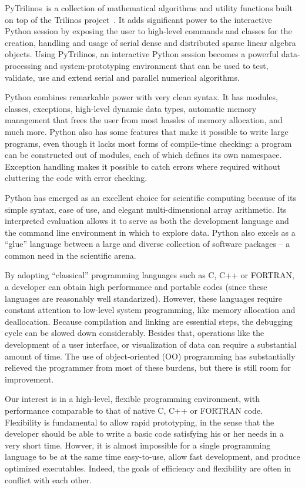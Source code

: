 \documentclass[10pt,relax]{SANDreport}
\newcommand{\PyTrilinos}{{PyTrilinos}}
\begin{document}
\PyTrilinos\ is a collection of mathematical algorithms and utility
functions built on top of the Trilinos
project~\cite{Trilinos-home-page}.  It adds significant power to the
interactive Python session by exposing the user to high-level commands
and classes for the creation, handling and usage of serial dense and
distributed sparse linear algebra objects. Using \PyTrilinos, an
interactive Python session becomes a powerful data-processing and
system-prototyping environment that can be used to test, validate, use
and extend serial and parallel numerical algorithms.

Python combines remarkable power with very clean syntax. It has
modules, classes, exceptions, high-level dynamic data types, automatic
memory management that frees the user from most hassles of memory
allocation, and much more. Python also has some features that make it
possible to write large programs, even though it lacks most forms of
compile-time checking: a program can be constructed out of modules,
each of which defines its own namespace. Exception handling makes it
possible to catch errors where required without cluttering the code
with error checking.

Python has emerged as an excellent choice for scientific computing
because of its simple syntax, ease of use, and elegant
multi-dimensional array arithmetic. Its interpreted evaluation allows
it to serve as both the development language and the command line
environment in which to explore data. Python also excels as a ``glue''
language between a large and diverse collection of software packages
-- a common need in the scientific arena.

\smallskip

By adopting ``classical'' programming languages such as C, C++ or
FORTRAN, a developer can obtain high performance and portable codes
(since these languages are reasonably well standarized).  However,
these languages require constant attention to low-level system
programming, like memory allocation and deallocation.  Because
compilation and linking are essential steps, the debugging cycle can
be slowed down considerably.  Besides that, operations like the
development of a user interface, or visualization of data can require
a substantial amount of time. The use of object-oriented (OO)
programming has substantially relieved the programmer from most of
these burdens, but there is still room for improvement.

Our interest is in a high-level, flexible programming environment,
with performance comparable to that of native C, C++ or FORTRAN
code. Flexibility is fundamental to allow rapid prototyping, in the
sense that the developer should be able to write a basic code
satisfying his or her needs in a very short time.  Howver, it is
almost impossible for a single programming language to be at the same
time easy-to-use, allow fast development, and produce optimized
executables. Indeed, the goals of efficiency and flexibility are often
in conflict with each other.
\end{document}
